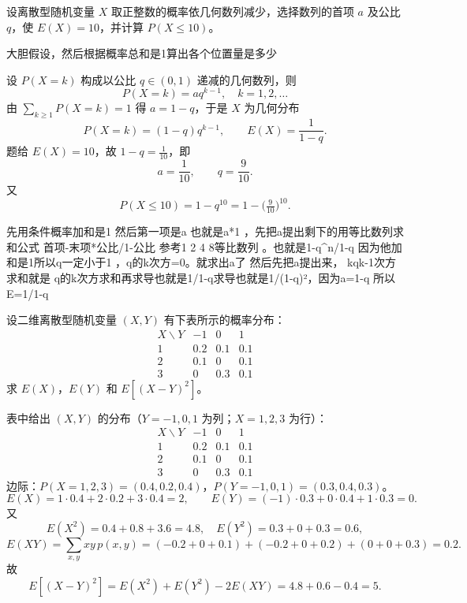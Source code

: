 \begin{homework}[3.7]
设离散型随机变量 $X$ 取正整数的概率依几何数列减少，选择数列的首项 $a$ 及公比 $q$，使 $E(X)=10$，并计算 $P(X\le10)$。
\end{homework}
\begin{dxtips}
    大胆假设，然后根据概率总和是1算出各个位置量是多少
\end{dxtips}
\begin{solution}[作业 3.7]
设 $P(X=k)$ 构成以公比 $q\in(0,1)$ 递减的几何数列，则
\[
P(X=k)=a q^{k-1},\quad k=1,2,\ldots
\]
由 $\sum_{k\ge1}P(X=k)=1$ 得 $a=1-q$，于是 $X$ 为几何分布
\[
P(X=k)=(1-q)q^{k-1},\qquad E(X)=\frac{1}{1-q}.
\]
题给 $E(X)=10$，故 $1-q=\frac1{10}$，即
\[
a=\frac{1}{10},\qquad q=\frac{9}{10}.
\]
又
\[
P(X\le 10)=1-q^{10}=1-\Big(\tfrac{9}{10}\Big)^{10}.
\]
\end{solution}
\begin{dxtips}
先用条件概率加和是1 然后第一项是a 也就是a*1 ，先把a提出剩下的用等比数列求和公式
首项-末项*公比/1-公比 参考1 2 4 8等比数列 。也就是1-q^n/1-q 因为他加和是1所以q一定小于1 ，q的k次方=0。就求出a了
然后先把a提出来， kqk-1次方求和就是 q的k次方求和再求导也就是1/1-q求导也就是1/(1-q)²，因为a=1-q 所以E=1/1-q
\end{dxtips}
\begin{homework}[3.19]
设二维离散型随机变量 $(X,Y)$ 有下表所示的概率分布：
\[
\begin{array}{c|ccc}
  X \backslash Y & -1 & 0 & 1 \\ \hline
  1 & 0.2 & 0.1 & 0.1 \\
  2 & 0.1 & 0 & 0.1 \\
  3 & 0 & 0.3 & 0.1
\end{array}
\]
求 $E(X)$，$E(Y)$ 和 $E[(X-Y)^2]$。
\end{homework}
\begin{solution}[作业 3.19]
表中给出 $(X,Y)$ 的分布（$Y=-1,0,1$ 为列；$X=1,2,3$ 为行）：
\[
\begin{array}{c|ccc}
X\backslash Y & -1 & 0 & 1\\\hline
1 & 0.2 & 0.1 & 0.1\\
2 & 0.1 & 0   & 0.1\\
3 & 0   & 0.3 & 0.1
\end{array}
\]
边际：$P(X=1,2,3)=(0.4,0.2,0.4)$，$P(Y=-1,0,1)=(0.3,0.4,0.3)$。
\[
E(X)=1\cdot0.4+2\cdot0.2+3\cdot0.4=2,
\qquad
E(Y)=(-1)\cdot0.3+0\cdot0.4+1\cdot0.3=0.
\]
又
\[
E(X^2)=0.4+0.8+3.6=4.8,\quad
E(Y^2)=0.3+0+0.3=0.6,
\]
\[
E(XY)=\sum_{x,y}xy\,p(x,y)=(-0.2+0+0.1)+(-0.2+0+0.2)+(0+0+0.3)=0.2.
\]
故
\[
E\!\left[(X-Y)^2\right]=E(X^2)+E(Y^2)-2E(XY)=4.8+0.6-0.4=5.
\]
\end{solution}

